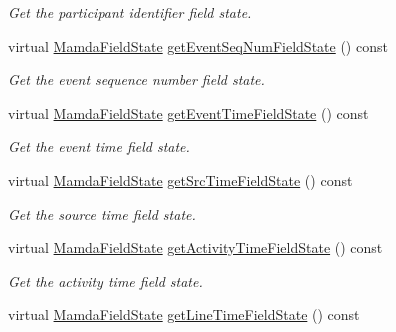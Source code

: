 \begin{CompactItemize}
\begin{CompactList}\small\item\em Get the participant identifier field state. \item\end{CompactList}\item 
virtual \hyperlink{namespaceWombat_93aac974f2ab713554fd12a1fa3b7d2a}{Mamda\-Field\-State} \hyperlink{classWombat_1_1MamdaOrderBookConcreteComplexDelta_a9b3bc0a4df49141cda98f802d2372f6}{get\-Event\-Seq\-Num\-Field\-State} () const 
\begin{CompactList}\small\item\em Get the event sequence number field state. \item\end{CompactList}\item 
virtual \hyperlink{namespaceWombat_93aac974f2ab713554fd12a1fa3b7d2a}{Mamda\-Field\-State} \hyperlink{classWombat_1_1MamdaOrderBookConcreteComplexDelta_4242850f2f309e4d770db4734b89254d}{get\-Event\-Time\-Field\-State} () const 
\begin{CompactList}\small\item\em Get the event time field state. \item\end{CompactList}\item 
virtual \hyperlink{namespaceWombat_93aac974f2ab713554fd12a1fa3b7d2a}{Mamda\-Field\-State} \hyperlink{classWombat_1_1MamdaOrderBookConcreteComplexDelta_673314cd0d612a82444d9dee126024b4}{get\-Src\-Time\-Field\-State} () const 
\begin{CompactList}\small\item\em Get the source time field state. \item\end{CompactList}\item 
virtual \hyperlink{namespaceWombat_93aac974f2ab713554fd12a1fa3b7d2a}{Mamda\-Field\-State} \hyperlink{classWombat_1_1MamdaOrderBookConcreteComplexDelta_907b71fab386608f4eb1e3de60b15b72}{get\-Activity\-Time\-Field\-State} () const 
\begin{CompactList}\small\item\em Get the activity time field state. \item\end{CompactList}\item 
virtual \hyperlink{namespaceWombat_93aac974f2ab713554fd12a1fa3b7d2a}{Mamda\-Field\-State} \hyperlink{classWombat_1_1MamdaOrderBookConcreteComplexDelta_9ef0367548a6c0f08db939e578cdf8b9}{get\-Line\-Time\-Field\-State} () const 

\end{CompactItemize}
